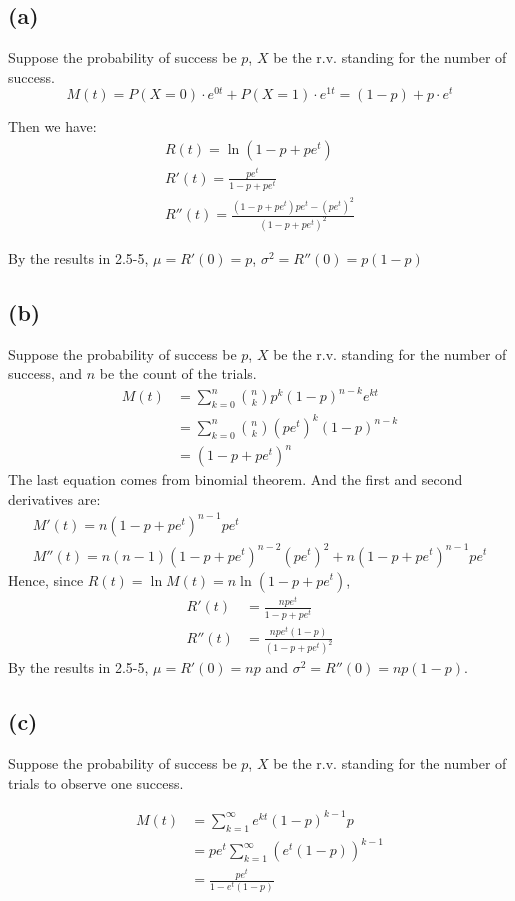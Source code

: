 \subsection*{(a)}
Suppose the probability of success be $p$, $X$ be the r.v. standing for the number of success.
$$M(t)=P(X=0)\cdot e^{0t}+P(X=1)\cdot e^{1t}=(1-p)+p\cdot e^t$$

Then we have:
\begin{align*}
    R(t)=\ln{(1-p+pe^t)} \\
    R'(t)=\frac{pe^t}{1-p+pe^t} \\
    R''(t)=\frac{(1-p+pe^t)pe^t-(pe^t)^2}{(1-p+pe^t)^2}
\end{align*}

By the results in 2.5-5, $\mu=R'(0)=p$, $\sigma^2=R''(0)=p(1-p)$
\subsection*{(b)}
Suppose the probability of success be $p$, $X$ be the r.v. standing for the number of success, and $n$ be the count of the trials.
\begin{align*}
    M(t)&=\sum^n_{k=0}\binom{n}{k}p^k(1-p)^{n-k}e^{kt} \\
    &=\sum^n_{k=0}\binom{n}{k}(pe^t)^k(1-p)^{n-k} \\
    &=(1-p+pe^t)^n
\end{align*}
The last equation comes from binomial theorem. And the first and second derivatives are:
\begin{align*}
    M'(t)=n(1-p+pe^t)^{n-1}pe^t \\
    M''(t)=n(n-1)(1-p+pe^t)^{n-2}(pe^t)^2+n(1-p+pe^t)^{n-1}pe^t
\end{align*}
Hence, since $R(t)=\ln M(t)=n\ln(1-p+pe^t)$,
\begin{align*}
    R'(t)&=\frac{npe^t}{1-p+pe^t} \\
    R''(t)&=\frac{npe^t(1-p)}{(1-p+pe^t)^2}
\end{align*}
By the results in 2.5-5, $\mu=R'(0)=np$ and $\sigma^2=R''(0)=np(1-p)$.
\subsection*{(c)}
Suppose the probability of success be $p$, $X$ be the r.v. standing for the number of trials to observe one success.

\begin{align*}
    M(t)&=\sum_{k=1}^{\infty}e^{kt}(1-p)^{k-1}p \\
    &=pe^t\sum_{k=1}^{\infty}(e^t(1-p))^{k-1} \\
    &=\frac{pe^t}{1-e^t(1-p)}
\end{align*}

